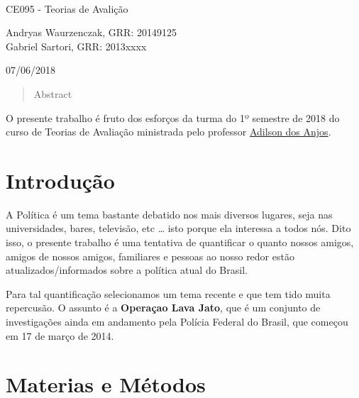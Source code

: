 \documentclass[]{article}
\title{}
\author{}
\date{}
\begin{document}
\begin{titlepage}
\\

\vspace{7.5cm}


\vspace{3cm}

CE095 - Teorias de Avalição

\vspace{2cm}

Andryas Waurzenczak, GRR: 20149125 \\
Gabriel Sartori, GRR: 2013xxxx


\vfill

07/06/2018
\end{titlepage}


\begin{abstract}
Abstract
\end{abstract}


\pagebreak
\tableofcontents
\pagebreak

O presente trabalho é fruto dos esforços da turma do 1º semestre de 2018
do curso de Teorias de Avaliação ministrada pelo professor
\href{}{Adilson dos Anjos}.

\section{Introdução}\label{introducao}

A Política é um tema bastante debatido nos mais diversos lugares, seja
nas universidades, bares, televisão, etc \ldots{} isto porque ela
interessa a todos nós. Dito isso, o presente trabalho é uma tentativa de
quantificar o quanto nossos amigos, amigos de nossos amigos, familiares
e pessoas ao nosso redor estão atualizados/informados sobre a política
atual do Brasil.

Para tal quantificação selecionamos um tema recente e que tem tido muita
repercusão. O assunto é a \textbf{Operaçao Lava Jato}, que é um conjunto
de investigações ainda em andamento pela Polícia Federal do Brasil, que
começou em 17 de março de 2014.

\section{Materias e Métodos}\label{materias-e-metodos}
\end{document}
